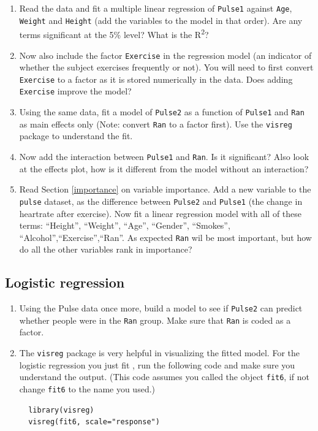 \documentclass[]{book}
\begin{document}
\begin{enumerate}
\def\labelenumi{\arabic{enumi}.}
\item
  Read the data and fit a multiple linear regression of \texttt{Pulse1} against \texttt{Age}, \texttt{Weight} and \texttt{Height} (add the variables to the model in that order). Are any terms significant at the 5\% level? What is the R\textsuperscript{2}?
\item
  Now also include the factor \texttt{Exercise} in the regression model (an indicator of whether the subject exercises frequently or not). You will need to first convert \texttt{Exercise} to a factor as it is stored numerically in the data. Does adding \texttt{Exercise} improve the model?
\item
  Using the same data, fit a model of \texttt{Pulse2} as a function of \texttt{Pulse1} and \texttt{Ran} as main effects only (Note: convert \texttt{Ran} to a factor first). Use the \texttt{visreg} package to understand the fit.
\item
  Now add the interaction between \texttt{Pulse1} and \texttt{Ran}. Is it significant? Also look at the effects plot, how is it different from the model without an interaction?
\item
  Read Section \ref{importance} on variable importance. Add a new variable to the \texttt{pulse} dataset, as the difference between \texttt{Pulse2} and \texttt{Pulse1} (the change in heartrate after exercise). Now fit a linear regression model with all of these terms: ``Height'', ``Weight'', ``Age'', ``Gender'', ``Smokes'', ``Alcohol'',``Exercise'',``Ran''. As expected \texttt{Ran} wil be most important, but how do all the other variables rank in importance?
\end{enumerate}

\hypertarget{logistic-regression}{%
\subsection{Logistic regression}\label{logistic-regression}}

\begin{enumerate}
\def\labelenumi{\arabic{enumi}.}
\item
  Using the Pulse data once more, build a model to see if \texttt{Pulse2} can predict whether people were in the \texttt{Ran} group. Make sure that \texttt{Ran} is coded as a factor.
\item
  The \texttt{visreg} package is very helpful in visualizing the fitted model. For the logistic regression you just fit , run the following code and make sure you understand the output. (This code assumes you called the object \texttt{fit6}, if not change \texttt{fit6} to the name you used.)

  \begin{verbatim}
  library(visreg)
  visreg(fit6, scale="response")
  \end{verbatim}
\end{enumerate}
\end{document}
